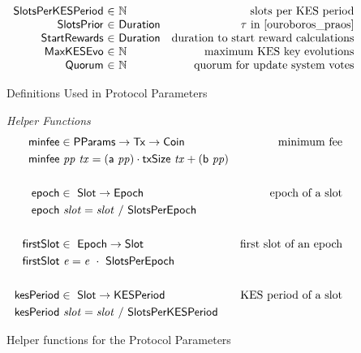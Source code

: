 \begin{figure*}[htb]
\begin{equation*}
\begin{array}{r@{~\in~}lr}
      \SlotsPerKESPeriod & \N & \text{slots per KES period} \\
      \SlotsPrior & \Duration & \tau\text{ in \cite{ouroboros_praos}}\\
      \StartRewards & \Duration & \text{duration to start reward calculations}\\
      \MaxKESEvo & \N & \text{maximum KES key evolutions}\\
      \Quorum & \N & \text{quorum for update system votes}\\
    \end{array}
  \end{equation*}
  \caption{Definitions Used in Protocol Parameters}
  \label{fig:defs:protocol-parameters}
\end{figure*}

\begin{figure*}[htb]
  \emph{Helper Functions}
  \begin{align*}
    \mathsf{minfee} & \in \mathsf{PParams} \to \mathsf{Tx} \to \mathsf{Coin} & \text{minimum fee}\\
    \mathsf{minfee} & ~\mathit{pp}~\mathit{tx} =
    (\mathsf{a}~\mathit{pp}) \cdot \mathsf{txSize}~\mathit{tx} + (\mathsf{b}~\mathit{pp})
    \\
    \\
    \mathsf{epoch} & \in ~ \mathsf{Slot} \to \mathsf{Epoch} & \text{epoch of a slot}
    \\
    \mathsf{epoch} & ~\mathit{slot} = \mathit{slot}~/~\mathsf{SlotsPerEpoch}
    \\
    \\
    \mathsf{firstSlot} & \in ~ \mathsf{Epoch} \to \mathsf{Slot}
               & \text{first slot of an epoch}
    \\
    \mathsf{firstSlot} & ~\mathit{e} = \mathit{e}~\cdot~\mathsf{SlotsPerEpoch}
    \\
    \\
    \mathsf{kesPeriod} & \in ~ \mathsf{Slot} \to \mathsf{KESPeriod} & \text{KES period of a slot}
    \\
    \mathsf{kesPeriod} & ~\mathit{slot} = \mathit{slot}~/~\mathsf{SlotsPerKESPeriod}
  \end{align*}
  \caption{Helper functions for the Protocol Parameters}
  \label{fig:defs:protocol-parameters-helpers}
\end{figure*}

\clearpage
